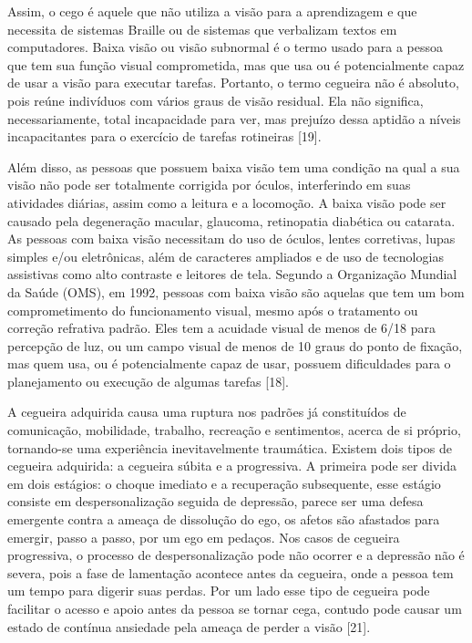 \documentclass[a4paper]{article}
\begin{document}
\begin{titlepage}
Assim, o cego é aquele que não utiliza a visão para a aprendizagem e que necessita de sistemas Braille ou de sistemas que verbalizam textos em computadores. Baixa visão ou visão subnormal é o termo usado para a pessoa que tem sua função visual comprometida, mas que usa ou é potencialmente capaz de usar a visão para executar tarefas. Portanto, o termo cegueira não é absoluto, pois reúne indivíduos com vários graus de visão residual. Ela não significa, necessariamente, total incapacidade para ver, mas prejuízo dessa aptidão a níveis incapacitantes para o exercício de tarefas rotineiras [19].

Além disso, as pessoas que possuem baixa visão tem uma condição na qual a sua visão não pode ser totalmente corrigida por óculos, interferindo em suas atividades diárias, assim como a leitura e a locomoção. A baixa visão pode ser causado pela degeneração macular, glaucoma, retinopatia diabética ou catarata. As pessoas com baixa visão necessitam do uso de óculos, lentes corretivas, lupas simples e/ou eletrônicas, além de caracteres ampliados e de uso de tecnologias assistivas como alto contraste e leitores de tela. Segundo a Organização Mundial da Saúde (OMS), em 1992, pessoas com baixa visão são aquelas que tem um bom comprometimento do funcionamento visual, mesmo após o tratamento ou correção refrativa padrão. Eles tem a acuidade visual de menos de 6/18 para percepção de luz, ou um campo visual de menos de 10 graus do ponto de fixação, mas quem usa, ou é potencialmente capaz de usar, possuem dificuldades para o planejamento ou execução de algumas tarefas [18].

A cegueira adquirida causa uma ruptura nos padrões já constituídos de comunicação, mobilidade, trabalho, recreação e sentimentos, acerca de si próprio, tornando-se uma experiência inevitavelmente traumática. Existem dois tipos de cegueira adquirida: a cegueira súbita e a progressiva. A primeira pode ser divida em dois estágios: o choque imediato e a recuperação subsequente, esse estágio consiste em despersonalização seguida de depressão, parece ser uma defesa emergente contra a ameaça de dissolução do ego, os afetos são afastados para emergir, passo a passo, por um ego em pedaços. Nos casos de cegueira progressiva, o processo de despersonalização pode não ocorrer e a depressão não é severa, pois a fase de lamentação acontece antes da cegueira, onde a pessoa tem um tempo para digerir suas perdas. Por um lado esse tipo de cegueira pode facilitar o acesso e apoio antes da pessoa se tornar cega, contudo pode causar um estado de contínua ansiedade pela ameaça de perder a visão [21].


\end{titlepage}
\end{document}
